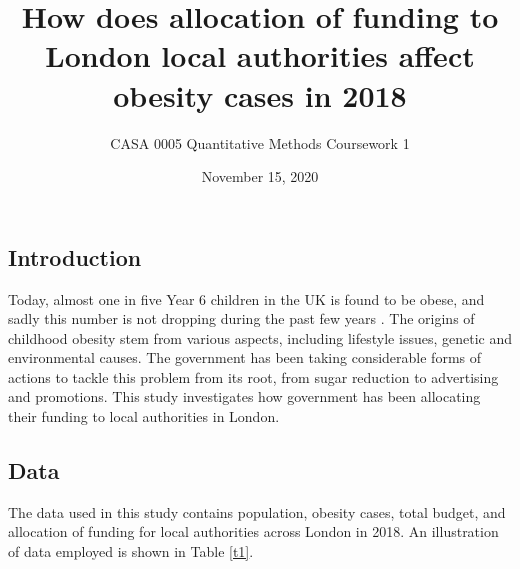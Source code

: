 \documentclass[12pt]{article}
\begin{document}
\title{How does allocation of funding to London local authorities affect obesity cases in 2018}
\author{CASA 0005 Quantitative Methods Coursework 1}
\date{November 15, 2020}
\maketitle
\subsection{Introduction}
Today, almost one in five Year 6 children in the UK is found to be obese, and sadly this number is not dropping during the past few years \citep{nhs_national_2018}. The origins of childhood obesity stem from various aspects, including lifestyle issues, genetic and environmental causes. The government has been taking considerable forms of actions to tackle this problem from its root, from sugar reduction to advertising and promotions. This study investigates how government has been allocating their funding to local authorities in London.


\subsection{Data}
The data used in this study contains population, obesity cases, total budget, and allocation of funding for local authorities across London in 2018. An illustration of data employed is shown in Table \eqref{t1}. 
\begin{table}[H]

\begin{center}
\captionsetup{font=scriptsize}
\caption{Illustration of data used, list of column names{} include: \newline
Names of local authority areas; total obesity cases in each area; total population; obesity density (obesity cases divided by population); total budget allocated (in pounds); percent of budget spent on improving air quality, cleaner environment, health training, raising school awareness, media awareness and subsiding counselling.
} \label{t1}
\end{center}
\end{table}
\end{document}

